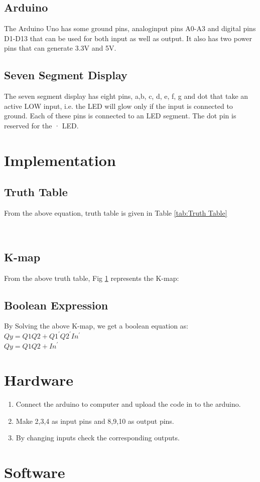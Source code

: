 \documentclass[journal,twocolumn,10pt, a4paper]{article}
\begin{document}
\subsection{Arduino}
The Arduino Uno has some ground pins, analoginput pins A0-A3 and digital pins D1-D13 that can be used for both input as well as output. It also has two power pins that can generate 3.3V and 5V.
\subsection{Seven Segment Display}
The seven segment display has eight pins, a,b, c, d, e, f, g and dot that take an active LOW input, i.e. the LED will glow only if the input is connected to ground. Each of these pins is connected to an LED segment. The dot pin is reserved for the · LED.

\section{Implementation}

\subsection{Truth Table}
From the above equation, truth table is given in Table \ref{tab:Truth Table}
\begin{table}[!h]
\centering

\caption{}
\label{tab:Truth Table}
\end{table}\\


\subsection{K-map}
From the above truth table, Fig \ref{fig:Fig 2} represents the K-map:
\begin{figure}[!h]

\caption{}
\label{fig:Fig 2}
\end{figure}

\subsection{Boolean Expression}
By Solving the above K-map, we get a boolean equation as: $Qy=Q1Q2+{Q1^\prime}{Q2^\prime}{In^\prime}$\\
$Qy=Q1Q2+{In^\prime}$


\section{Hardware}
\begin{enumerate}
\item Connect the arduino to computer and upload the code in to the arduino.
\item Make 2,3,4 as input pins and 8,9,10 as output pins.
\item By changing inputs check the corresponding outputs.
\end{enumerate}

\section{Software}

\end{document}
